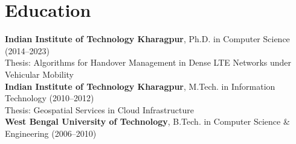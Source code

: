 \section{Education}
\textbf{Indian Institute of Technology Kharagpur}, Ph.D. in Computer Science (2014–2023) \\
Thesis: Algorithms for Handover Management in Dense LTE Networks under Vehicular Mobility \\
\textbf{Indian Institute of Technology Kharagpur}, M.Tech. in Information Technology (2010–2012) \\
Thesis: Geospatial Services in Cloud Infrastructure \\
\textbf{West Bengal University of Technology}, B.Tech. in Computer Science \& Engineering (2006–2010)
